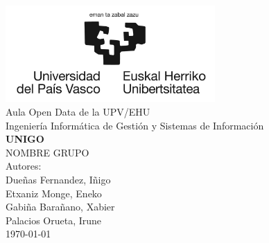 \documentclass[a4paper,12pt]{report}
\begin{document}
  \begin{titlepage}
    \centering
    \includegraphics[width=0.6\textwidth]{img/logo.jpg}\\
    \vspace{1cm}
    \LARGE Aula Open Data de la UPV/EHU\\
    \vspace{0.5cm}
    \Large Ingeniería Informática de Gestión y Sistemas de Información\\
    \vspace{3cm}
    \vspace{0.5cm}
    \Huge \textbf{UNIGO}\\
    \huge NOMBRE GRUPO\\
    \vspace{2.5cm}
    \Large Autores:\\
    \vspace{0.2cm}
    \large Dueñas Fernandez, Iñigo\\
    \large Etxaniz Monge, Eneko\\
    \large Gabiña Barañano, Xabier\\
    \large Palacios Orueta, Irune\\
    \vfill
    \today
  \end{titlepage}
\end{document}
